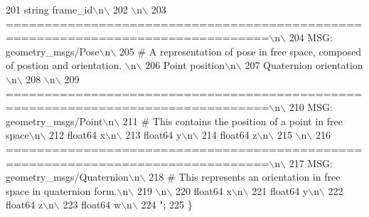 \begin{DoxyCode}
201 \textcolor{stringliteral}{string frame\_id\(\backslash\)n\(\backslash\)}
202 \textcolor{stringliteral}{\(\backslash\)n\(\backslash\)}
203 \textcolor{stringliteral}{================================================================================\(\backslash\)n\(\backslash\)}
204 \textcolor{stringliteral}{MSG: geometry\_msgs/Pose\(\backslash\)n\(\backslash\)}
205 \textcolor{stringliteral}{# A representation of pose in free space, composed of postion and orientation. \(\backslash\)n\(\backslash\)}
206 \textcolor{stringliteral}{Point position\(\backslash\)n\(\backslash\)}
207 \textcolor{stringliteral}{Quaternion orientation\(\backslash\)n\(\backslash\)}
208 \textcolor{stringliteral}{\(\backslash\)n\(\backslash\)}
209 \textcolor{stringliteral}{================================================================================\(\backslash\)n\(\backslash\)}
210 \textcolor{stringliteral}{MSG: geometry\_msgs/Point\(\backslash\)n\(\backslash\)}
211 \textcolor{stringliteral}{# This contains the position of a point in free space\(\backslash\)n\(\backslash\)}
212 \textcolor{stringliteral}{float64 x\(\backslash\)n\(\backslash\)}
213 \textcolor{stringliteral}{float64 y\(\backslash\)n\(\backslash\)}
214 \textcolor{stringliteral}{float64 z\(\backslash\)n\(\backslash\)}
215 \textcolor{stringliteral}{\(\backslash\)n\(\backslash\)}
216 \textcolor{stringliteral}{================================================================================\(\backslash\)n\(\backslash\)}
217 \textcolor{stringliteral}{MSG: geometry\_msgs/Quaternion\(\backslash\)n\(\backslash\)}
218 \textcolor{stringliteral}{# This represents an orientation in free space in quaternion form.\(\backslash\)n\(\backslash\)}
219 \textcolor{stringliteral}{\(\backslash\)n\(\backslash\)}
220 \textcolor{stringliteral}{float64 x\(\backslash\)n\(\backslash\)}
221 \textcolor{stringliteral}{float64 y\(\backslash\)n\(\backslash\)}
222 \textcolor{stringliteral}{float64 z\(\backslash\)n\(\backslash\)}
223 \textcolor{stringliteral}{float64 w\(\backslash\)n\(\backslash\)}
224 \textcolor{stringliteral}{"};
225   \}
\end{DoxyCode}

